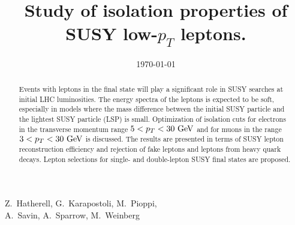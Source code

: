 \documentclass{cmspaper}
\begin{document}

\begin{titlepage}

   \date{\today}

 \title{Study of isolation properties of SUSY low-$p_T$ leptons.}

  \begin{Authlist}
    Z.~Hatherell, G.~Karapostoli, M.~Pioppi,\\
 A.~Savin,
    A.~Sparrow, M.~Weinberg
  \end{Authlist}

  \begin{abstract}
    Events with leptons in the final state will play a significant role in SUSY searches at initial
    LHC luminosities. The energy spectra of the leptons is expected to be soft, especially in models
    where the mass difference between the initial SUSY particle and the lightest SUSY particle (LSP)
    is small. Optimization of isolation cuts for electrons in the transverse momentum range
    $5 < p_T < 30~{\rm GeV}$ and for muons in the range $3 < p_T < 30~{\rm GeV}$ is discussed. The
    results are presented in terms of SUSY lepton reconstruction efficiency and rejection of fake
    leptons and leptons from heavy quark decays. Lepton selections for single- and double-lepton
    SUSY final states are proposed.
  \end{abstract}


\end{titlepage}

\setcounter{page}{2}%
\end{document}
